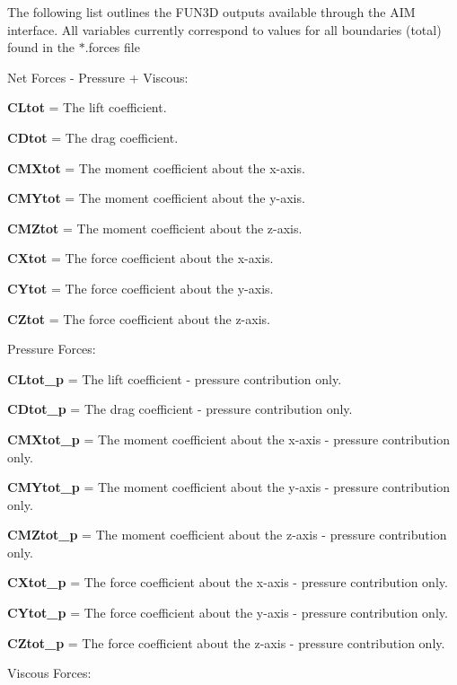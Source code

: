 The following list outlines the FUN3D outputs available through the AIM interface. All variables currently correspond to values for all boundaries (total) found in the $\ast$.forces file

Net Forces -\/ Pressure + Viscous\+:
\begin{DoxyItemize}
\item {\bfseries{CLtot}} = The lift coefficient.
\item {\bfseries{CDtot}} = The drag coefficient.
\item {\bfseries{CMXtot}} = The moment coefficient about the x-\/axis.
\item {\bfseries{CMYtot}} = The moment coefficient about the y-\/axis.
\item {\bfseries{CMZtot}} = The moment coefficient about the z-\/axis.
\item {\bfseries{CXtot}} = The force coefficient about the x-\/axis.
\item {\bfseries{CYtot}} = The force coefficient about the y-\/axis.
\item {\bfseries{CZtot}} = The force coefficient about the z-\/axis.
\end{DoxyItemize}Pressure Forces\+:
\begin{DoxyItemize}
\item {\bfseries{CLtot\+\_\+p}} = The lift coefficient -\/ pressure contribution only.
\item {\bfseries{CDtot\+\_\+p}} = The drag coefficient -\/ pressure contribution only.
\item {\bfseries{CMXtot\+\_\+p}} = The moment coefficient about the x-\/axis -\/ pressure contribution only.
\item {\bfseries{CMYtot\+\_\+p}} = The moment coefficient about the y-\/axis -\/ pressure contribution only.
\item {\bfseries{CMZtot\+\_\+p}} = The moment coefficient about the z-\/axis -\/ pressure contribution only.
\item {\bfseries{CXtot\+\_\+p}} = The force coefficient about the x-\/axis -\/ pressure contribution only.
\item {\bfseries{CYtot\+\_\+p}} = The force coefficient about the y-\/axis -\/ pressure contribution only.
\item {\bfseries{CZtot\+\_\+p}} = The force coefficient about the z-\/axis -\/ pressure contribution only.
\end{DoxyItemize}Viscous Forces\+:
